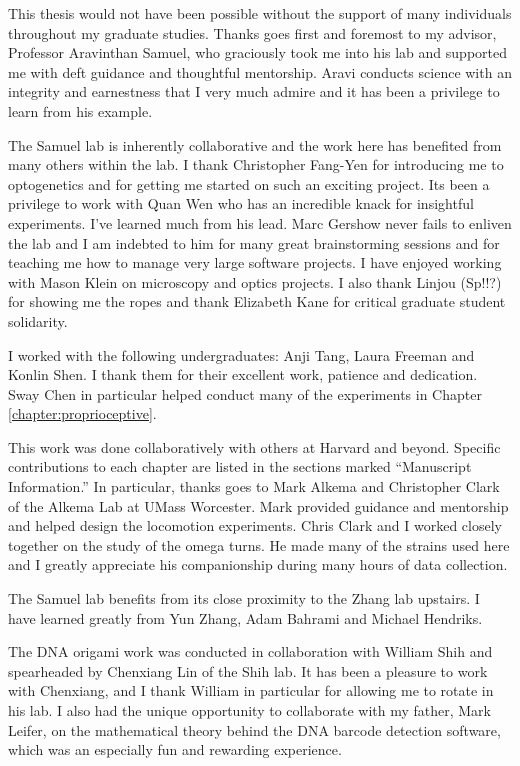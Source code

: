 
This thesis would not have been possible without the support of many individuals throughout my graduate studies. Thanks goes first and foremost to my advisor, Professor Aravinthan Samuel, who graciously took me into his lab and supported me with deft  guidance and thoughtful mentorship. Aravi conducts science with an integrity and earnestness that I very much admire and it has been a privilege to learn from his example.


The Samuel lab is inherently collaborative and the work here has benefited from many others within the lab. I  thank Christopher Fang-Yen for introducing me to optogenetics and for getting me started on such an exciting project. Its been a privilege to work with Quan Wen who has an incredible knack for insightful experiments. I've learned much from his lead. Marc Gershow never fails to enliven the lab and I am indebted to him for many great brainstorming sessions and for teaching me how to manage very large software projects. I have enjoyed working with Mason Klein on microscopy and optics projects.  I also thank Linjou (Sp!!?) for showing me the ropes and thank Elizabeth Kane for critical graduate student solidarity.

I worked with the following undergraduates: Anji Tang, Laura Freeman and Konlin Shen. I thank them for their excellent work, patience and dedication. Sway Chen in particular helped conduct many of the experiments in Chapter \ref{chapter:proprioceptive}.

This work was done collaboratively with others at Harvard and beyond. Specific contributions to each chapter are listed in the sections marked ``Manuscript Information.'' In particular, thanks goes to Mark Alkema and Christopher Clark of the Alkema Lab at UMass Worcester. Mark provided guidance and mentorship and helped design the locomotion experiments. Chris Clark and I worked closely together on the study of the omega turns. He made many of the strains used here and I greatly appreciate his companionship during many hours of data collection.

The Samuel lab benefits from its close proximity to the Zhang lab upstairs. I have learned greatly from Yun Zhang, Adam Bahrami and Michael Hendriks.

The DNA origami work was conducted in collaboration with William Shih and spearheaded by Chenxiang Lin of the Shih lab.  It has been a pleasure to work with Chenxiang, and I thank William in particular for allowing me to rotate in his lab. I also had the unique opportunity to collaborate with my father, Mark Leifer, on the mathematical theory behind the DNA barcode detection software, which was an especially fun and rewarding experience.

